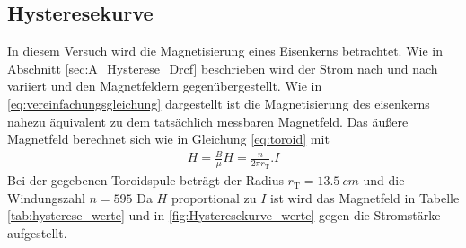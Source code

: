 \subsection{Hysteresekurve}
In diesem Versuch wird die Magnetisierung eines Eisenkerns betrachtet.
Wie in Abschnitt \ref{sec:A_Hysterese_Drcf} beschrieben wird der Strom nach und nach variiert 
und den Magnetfeldern gegenübergestellt.
Wie in \ref{eq:vereinfachungsgleichung} dargestellt ist die Magnetisierung des eisenkerns nahezu äquivalent zu dem tatsächlich messbaren Magnetfeld.
Das äußere Magnetfeld berechnet sich wie in Gleichung \ref{eq:toroid} mit
\begin{align}
    H = \frac{B}{\mu}
    H = \frac{n}{2 \pi r_\text{T}}. I
\end{align}
Bei der gegebenen Toroidspule beträgt der Radius $r_\text{T}= \qty{13.5}{cm}$ und die Windungszahl $n = 595$
Da $H$ proportional zu $I$ ist wird das Magnetfeld in Tabelle \ref{tab:hysterese_werte}
und in \ref{fig:Hysteresekurve_werte} gegen die Stromstärke aufgestellt.







